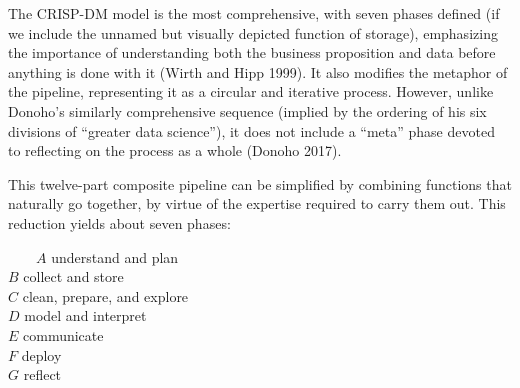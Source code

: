 \documentclass[
  letterpaper,
  DIV=11,
  numbers=noendperiod]{scrreprt}
\begin{document}
The CRISP-DM model is the most comprehensive, with seven phases defined
(if we include the unnamed but visually depicted function of storage),
emphasizing the importance of understanding both the business
proposition and data before anything is done with it (Wirth and Hipp
1999). It also modifies the metaphor of the pipeline, representing it as
a circular and iterative process. However, unlike Donoho's similarly
comprehensive sequence (implied by the ordering of his six divisions of
``greater data science''), it does not include a ``meta'' phase devoted
to reflecting on the process as a whole (Donoho 2017).

This twelve-part composite pipeline can be simplified by combining
functions that naturally go together, by virtue of the expertise
required to carry them out. This reduction yields about seven phases:

~~~~\(A\) understand and plan\\
\hspace*{0.333em}\hspace*{0.333em}\hspace*{0.333em}\hspace*{0.333em}\(B\)
collect and store\\
\hspace*{0.333em}\hspace*{0.333em}\hspace*{0.333em}\hspace*{0.333em}\(C\)
clean, prepare, and explore\\
\hspace*{0.333em}\hspace*{0.333em}\hspace*{0.333em}\hspace*{0.333em}\(D\)
model and interpret\\
\hspace*{0.333em}\hspace*{0.333em}\hspace*{0.333em}\hspace*{0.333em}\(E\)
communicate\\
\hspace*{0.333em}\hspace*{0.333em}\hspace*{0.333em}\hspace*{0.333em}\(F\)
deploy\\
\hspace*{0.333em}\hspace*{0.333em}\hspace*{0.333em}\hspace*{0.333em}\(G\)
reflect
\end{document}
